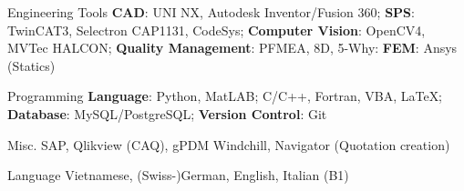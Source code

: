 

\begin{cvskills}


  \cvskill
    {Engineering Tools} %
    {\textbf{CAD}: UNI NX, Autodesk Inventor/Fusion 360; 
    \newline \textbf{SPS}: TwinCAT3, Selectron CAP1131, CodeSys;
    \newline \textbf{Computer Vision}: OpenCV4, MVTec HALCON;
    \newline \textbf{Quality Management}: PFMEA, 8D, 5-Why:
  \newline \textbf{FEM}: Ansys (Statics)} %

%

  \cvskill
    {Programming} %
    {\textbf{Language}: Python, MatLAB; C/C++, Fortran, VBA, LaTeX; 
      \newline \textbf{Database}: MySQL/PostgreSQL;
      \newline \textbf{Version Control}: Git
      } %

  \cvskill
    {Misc.} %
    {SAP, Qlikview (CAQ), gPDM Windchill, Navigator (Quotation creation)} %

  \cvskill
    {Language} %
    {Vietnamese, (Swiss-)German, English, Italian (B1)} %

\end{cvskills}
